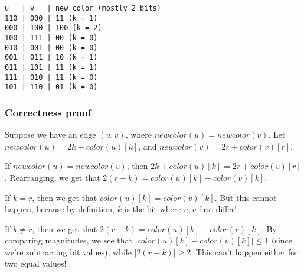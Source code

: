 \begin{verbatim}
u   | v   | new color (mostly 2 bits)
110 | 000 | 11 (k = 1)
000 | 100 | 100 (k = 2)
100 | 111 | 00 (k = 0)
010 | 001 | 00 (k = 0)
001 | 011 | 10 (k = 1)
011 | 101 | 11 (k = 1)
111 | 010 | 11 (k = 0)
101 | 110 | 01 (k = 0)
\end{verbatim}

\subsubsection{Correctness proof}
Suppose we have an edge $(u, v)$, where $newcolor(u) = newcolor(v)$.
Let $newcolor(u) = 2k + color(u)[k]$, and $newcolor(v) = 2r + color(v)[r]$.

If $newcolor(u) = newcolor(v)$, then $2k + color(u)[k] = 2r + color(v)[r]$.
Rearranging, we get that $2(r - k) = color(u)[k] - color(v)[k]$.


If $k = r$, then we get that $color(u)[k] = color(v)[k]$. But this cannot
happen, because by definition, $k$ is the bit where $u, v$ first differ!


If $k \neq r$, then we get that $2(r - k) = color(u)[k] - color(v)[k]$.
By comparing magnitudes, we see that $\big|color(u)[k] - color(v)[k]\big| \leq 1$
(since we're subtracting bit values), while $\big|2(r - k)\big| \geq 2$. 
This can't happen either for two equal values!


